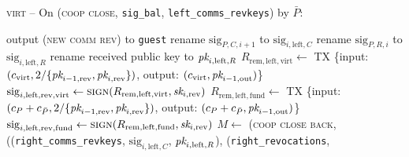 \begin{center}
\begin{processbox}{\textsc{virt} -- On (\textsc{coop close},
  \texttt{sig\_bal}, \texttt{left\_comms\_revkeys}) by $\bar{P}$:}
\begin{algorithmic}[1]
        \EndFor
      \EndIf
      \State output (\textsc{new comm rev}) to \texttt{guest}
      \State {} 
      \State {}
      \label{code:virtual-layer:coop-close-intermediary:left-interm-sign-comm}
      \State {}
      \State {}
      \label{code:virtual-layer:coop-close-intermediary:left-interm-sign-rev}
      \State {}
      \State {}
      \label{code:virtual-layer:coop-close-intermediary:left-interm-send-comm-rev}
      \State rename $\mathrm{sig}_{P, C, i+1}$ to $\mathrm{sig}_{i,
      \mathrm{left}, C}$
      \State rename $\mathrm{sig}_{P, R, i}$ to $\mathrm{sig}_{i,
      \mathrm{left}, R}$
      \State rename received public key to $\textit{pk}_{i, \mathrm{left}, R}$
      \State $R_{\mathrm{rem}, \mathrm{left}, \mathrm{virt}} \gets$ TX \{input:
      $(c_{\mathrm{virt}}, 2/\{\textit{pk}_{i-1, \mathrm{rev}}, \textit{pk}_{i, \mathrm{rev}}\})$,
      output: $(c_{\mathrm{virt}}, \textit{pk}_{i-1, \mathrm{out}})$\}
      \State $\mathrm{sig}_{i, \mathrm{left}, \mathrm{rev}, \mathrm{virt}} \gets
      \textsc{sign}(R_{\mathrm{rem}, \mathrm{left}, \mathrm{virt}}, \textit{sk}_{i,
      \mathrm{rev}})$
      \State $R_{\mathrm{rem}, \mathrm{left}, \mathrm{fund}} \gets$ TX \{input:
      $(c_P + c_{\bar{P}}, 2/\{\textit{pk}_{i-1, \mathrm{rev}}, \textit{pk}_{i,
      \mathrm{rev}}\})$, output: $(c_P + c_{\bar{P}}, \textit{pk}_{i-1, \mathrm{out}})$\}
      \State $\mathrm{sig}_{i, \mathrm{left}, \mathrm{rev}, \mathrm{fund}} \gets
      \textsc{sign}(R_{\mathrm{rem}, \mathrm{left}, \mathrm{fund}}, \textit{sk}_{i,
      \mathrm{rev}})$
       
        \State $M \gets$ (\textsc{coop close back},
        ((\texttt{right\_comms\_revkeys}, $\mathrm{sig}_{i, \mathrm{left}, C}$,
        $\textit{pk}_{i, \mathrm{left}, R}$), (\texttt{right\_revocations},

\end{algorithmic}
\end{processbox}
\end{center}
